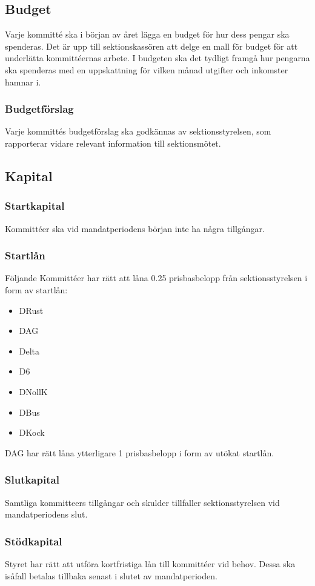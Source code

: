 \documentclass[a4paper]{dtek}
\newcommand{\prisbasbelopp}[1]{
    #1 prisbasbelopp
    \ifdef{\nuvarandeprisbasbelopp}{
        \marginpar{
            \small{ \textbf{\roundandprint{\xintiexpr#1 * \nuvarandeprisbasbelopp\relax}kr}}
        }
    }{}
}
\begin{document}
\subsection{Budget}
\label{sec:budget}
Varje kommitté ska i början av året lägga en budget för hur dess pengar ska spenderas. Det är upp till sektionskassören att delge en mall för budget för att underlätta kommittéernas arbete. I budgeten ska det tydligt framgå hur pengarna ska spenderas med en uppskattning för vilken månad utgifter och inkomster hamnar i.

\subsubsection{Budgetförslag}
Varje kommittés budgetförslag ska godkännas av sektionsstyrelsen, som rapporterar vidare relevant information till sektionsmötet.


\subsection{Kapital}
\label{sec:sektionsforeningar_startkapital}
\subsubsection{Startkapital}
Kommittéer ska vid mandatperiodens början inte ha några tillgångar.
\subsubsection{Startlån}
Följande Kommittéer har rätt att låna \prisbasbelopp{0.25} från sektionsstyrelsen i form av startlån:
\begin{itemize}
  \item DRust
  \item DAG
  \item Delta
  \item D6
  \item DNollK
  \item DBus
  \item DKock
\end{itemize}
DAG har rätt låna ytterligare \prisbasbelopp{1} i form av utökat startlån.
\subsubsection{Slutkapital}
Samtliga kommitteers tillgångar och skulder tillfaller sektionsstyrelsen vid mandatperiodens slut.
\subsubsection{Stödkapital}
Styret har rätt att utföra kortfristiga lån till kommittéer vid behov. Dessa ska isåfall betalas tillbaka senast i slutet av mandatperioden.
\end{document}
